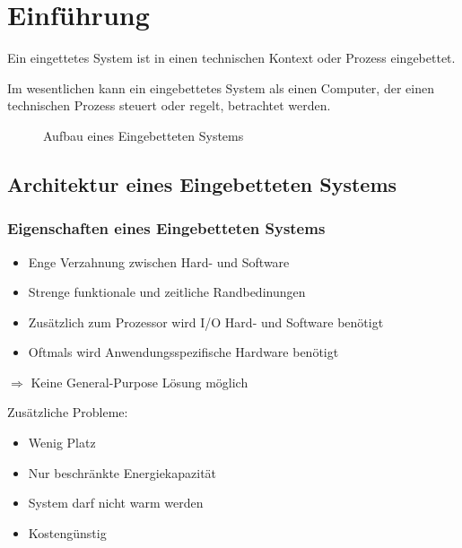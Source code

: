 \chapter{Einführung}
Ein eingettetes System ist in einen technischen Kontext oder Prozess eingebettet.

Im wesentlichen kann ein eingebettetes System als einen Computer, der einen technischen Prozess steuert oder regelt, betrachtet werden.
\begin{figure}[H]
    \centering
    \caption{Aufbau eines Eingebetteten Systems}
\end{figure}

\section{Architektur eines Eingebetteten Systems}
\subsection{Eigenschaften eines Eingebetteten Systems}
\begin{itemize}
    \item Enge Verzahnung zwischen Hard- und Software
    \item Strenge funktionale und zeitliche Randbedinungen
    \item Zusätzlich zum Prozessor wird I/O Hard- und Software benötigt
    \item Oftmals wird Anwendungsspezifische Hardware benötigt
\end{itemize}
$\Rightarrow$ Keine \glqq{}General-Purpose\grqq{} Lösung möglich

Zusätzliche Probleme:
\begin{itemize}
    \item Wenig Platz
    \item Nur beschränkte Energiekapazität
    \item System darf nicht warm werden
    \item Kostengünstig
\end{itemize}

